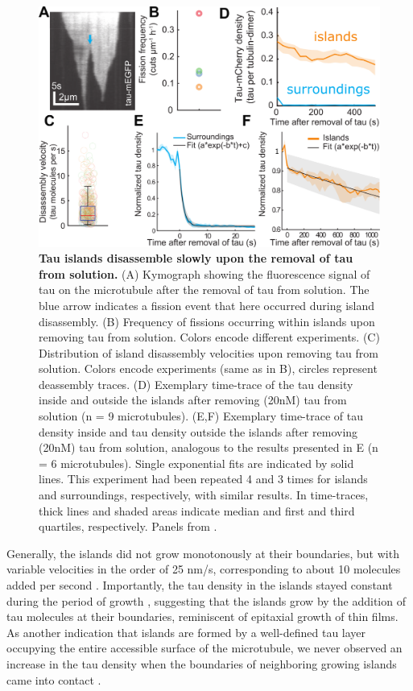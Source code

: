 \begin{figure}
	\centering
	\includegraphics[width=1\linewidth]{Figures/tauSHRINK.png}
	\caption[Tau islands disassemble slowly upon the removal of tau from solution.]{
	\textbf{Tau islands disassemble slowly upon the removal of tau from solution.} (A) Kymograph showing the fluorescence signal of tau on the microtubule after the removal of tau from solution. The blue arrow indicates a fission event that here occurred during island disassembly. (B) Frequency of fissions occurring within islands upon removing tau from solution. Colors encode different experiments. (C) Distribution of island disassembly velocities upon removing tau from solution. Colors encode experiments (same as in B), circles represent deassembly traces. (D) Exemplary time-trace of the tau density inside and outside the islands after removing (20nM) tau from solution (n = 9 microtubules). (E,F) Exemplary time-trace of tau density inside and tau density outside the islands after removing (20nM) tau from solution, analogous to the results presented in E (n = 6 microtubules). Single exponential fits are indicated by solid lines. This experiment had been repeated 4 and 3 times for islands and surroundings, respectively, with similar results. In time-traces, thick lines and shaded areas indicate median and first and third quartiles, respectively. Panels from \cite{Siahaan2019a}.
		}\label{tauSHRINK}
\end{figure}
Generally, the islands did not grow monotonously at their boundaries, but with variable velocities in the order of 25 nm/s, corresponding to about 10 molecules added per second .  Importantly, the tau density in the islands stayed constant during the period of growth , suggesting that the islands grow by the addition of tau molecules at their boundaries, reminiscent of epitaxial growth of thin films. As another indication that islands are formed by a well-defined tau layer occupying the entire accessible surface of the microtubule, we never observed an increase in the tau density when the boundaries of neighboring growing islands came into contact .\par

